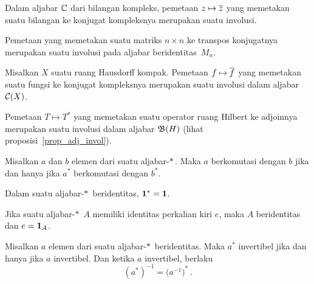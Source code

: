 \begin{exam} Dalam aljabar $\mathbb{C}$ dari bilangan kompleks, pemetaan $z \mapsto \overline{z}$ yang memetakan suatu
bilangan ke konjugat kompleksnya merupakan suatu involusi.
\end{exam}

\begin{exam}\label{0010902} Pemetaan yang memetakan suatu matriks $n \times n$ ke transpos konjugatnya
merupakan suatu involusi pada aljabar beridentitas~$M_n$.
\end{exam}

\begin{exam} Misalkan $X$ suatu ruang Hausdorff kompak.  Pemetaan $f \mapsto \overline{f}$ yang memetakan suatu
fungsi ke konjugat kompleksnya merupakan suatu involusi dalam aljabar~$\mathcal{C}(X)$.
\end{exam}

\begin{exam} Pemetaan $T \mapsto T^*$ yang memetakan suatu operator ruang Hilbert ke adjoinnya merupakan suatu
involusi dalam aljabar $\mathfrak{B}(H)$ (lihat proposisi~\ref{prop_adj_invol}).
\end{exam}

\begin{prop} Misalkan $a$ dan $b$ elemen dari suatu aljabar-$*\,$.  Maka $a$ berkomutasi dengan $b$
jika dan hanya jika $a^*$ berkomutasi dengan $b^*$.
\end{prop}

\begin{prop} Dalam suatu aljabar-$*\,$ beridentitas, $\mathbf{1}^* = \mathbf{1}$.
\end{prop}

\begin{prop}\label{00109125} Jika suatu aljabar-$*\,$ $A$ memiliki identitas perkalian kiri $e$,
maka $A$ beridentitas dan $e = \mathbf{1}_A$.
\end{prop}

\begin{prop}\label{00109128fa} Misalkan $a$ elemen dari suatu aljabar-$*\,$ beridentitas.  Maka $a^*$ invertibel jika dan hanya jika $a$ invertibel.
Dan ketika $a$ invertibel, berlaku
   \[ (a^*)^{-1} = \bigl(a^{-1}\bigr)^*\,. \]
\end{prop}


